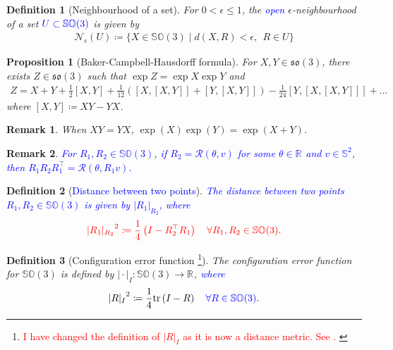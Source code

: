 \documentclass{article}
\newcommand{\SOthree}{\mathbb{SO}(3)}
\newcommand{\sothree}{\mathfrak{so}(3)}
\newcommand{\R}[1]{\mathbb{R}^{#1}}
\newtheorem{remark}{Remark}
\newtheorem{definition}{Definition}
\newtheorem{proposition}{Proposition}
\newcommand{\trace}[1]{\text{tr}\left(#1\right)}
\newcommand{\brackets}[1]{\left(#1\right)}
\newcommand{\textblue}[1]{\textcolor{blue}{#1}}
\newcommand{\normSOthree}[1]{{{\vert}#1 {\vert}_I}}
\newcommand{\neighbourhood}[2]{\mathcal{N}_{#1}(#2)}
\begin{document}
\begin{definition}[Neighbourhood of a set]
    For $0 < \epsilon \leq 1$, the \textblue{open} $\epsilon$-neighbourhood of a set $\textblue{U\subset\SOthree}$ is given by 
    \begin{align*}
        \neighbourhood{\epsilon}{U} \coloneqq \{X\in\SOthree \mid d(X, R) < \epsilon,\:\:  R\in U\}
    \end{align*}
\end{definition}

\begin{proposition}[Baker-Campbell-Hausdorff formula]
For $X,Y\in \sothree$, there exists $ Z\in\sothree$ such that $\exp{Z} = \exp{X}\exp{Y}$ and 
\begin{align*}
    Z = X + Y + \frac{1}{2}[X, Y] + \frac{1}{12}\brackets{[X,[X,Y]] + [Y, [X,Y]]} - \frac{1}{24}[Y,[X,[X,Y]]] + ...
\end{align*}
where $[X,Y]\coloneqq XY - YX$. 
\end{proposition}

\begin{remark} \label{remark:baker-campbell-hausdorff}
When $XY = YX$, $\exp(X)\exp{(Y)} = \exp{(X+Y)}$. 
\end{remark}

\begin{remark}\label{remark:axis}
    \textblue{For $R_1, R_2\in\SOthree$, if $R_2 = \mathcal{R}(\theta, v)$ for some $\theta\in\R{}$ and $v\in\mathbb{S}^2$, then $R_1R_2R_1^\top = \mathcal{R}(\theta, R_1 v)$. }
\end{remark}

\begin{definition}[\textblue{Distance between two points}]\label{def:dist_between_points}
    \textblue{The distance between two points $R_1, R_2\in\SOthree$  is given by $|R_1|_{R_2}$, where }
    \begin{align*}
        \textcolor{red}{{|R_1|_{R_2}}^2 \coloneqq \frac{1}{4}\brackets{I - R_2^\top R_1} \quad \forall R_1, R_2 \in \SOthree.}
    \end{align*}
\end{definition}

\begin{definition}[Configuration error function \footnote{\textcolor{red}{I have changed the definition of $\normSOthree{R}$ as it is now a distance metric. See \cite{SO3metric}. }}]\label{def:config_err}
    The configuration error function for $\SOthree$ is defined by $\normSOthree{\cdot}: \SOthree \to \R{}$, \textblue{where} \textcolor{red}{\[{\normSOthree{R}^2 \coloneqq \frac{1}{4}\trace{I - {R}} \quad \textblue{\forall R\in\SOthree}}.\]}
\end{definition}
\end{document}
